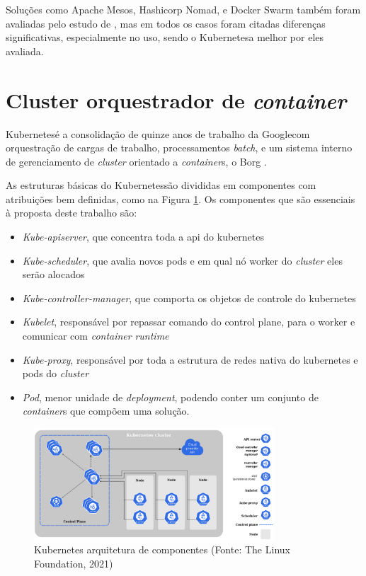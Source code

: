 Soluções como Apache Mesos, Hashicorp Nomad, e Docker Swarm também foram avaliadas pelo estudo de \cite{truyen_comprehensive_2021}, mas em todos os casos foram citadas diferenças significativas, especialmente no uso, sendo o Kubernetes\textregistered a melhor por eles avaliada. 

\section{Cluster orquestrador de \emph{container}}

Kubernetes\textregistered é a consolidação de quinze anos de trabalho da Google\textregistered com orquestração de cargas de trabalho, processamentos \emph{batch}, e um sistema interno de gerenciamento de \emph{cluster} orientado a \emph{container}s, o Borg \cite{verma_large-scale_2015}. 

As estruturas básicas do Kubernetes\textregistered são divididas em componentes com atribuições bem definidas, como na Figura \ref{fig:kubenode}. Os componentes que são essenciais à proposta deste trabalho são:
\begin{itemize}
    \item \emph{Kube-apiserver}, que concentra toda a api do kubernetes
    \item \emph{Kube-scheduler}, que avalia novos pods e em qual nó worker do \emph{cluster} eles serão alocados
    \item \emph{Kube-controller-manager}, que comporta os objetos de controle do kubernetes
    \item \emph{Kubelet}, responsável por repassar comando do control plane, para o worker e comunicar com \emph{container} \emph{runtime}
    \item \emph{Kube-proxy}, responsável por toda a estrutura de redes nativa do kubernetes e pods do \emph{cluster}
    \item \emph{Pod}, menor unidade de \emph{deployment}, podendo conter um conjunto de \emph{container}s que compõem uma solução.
\end{itemize}

\begin{figure}[!h]
    \centering
    \includegraphics[width=0.8\textwidth]{04-figuras/kubeadm-node.png}
    \caption{Kubernetes arquitetura de componentes (Fonte: The Linux Foundation\textregistered, 2021)}
    \label{fig:kubenode}
\end{figure}



